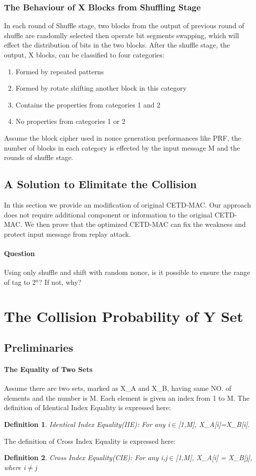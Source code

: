 \documentclass{article}
\newtheorem{defination}{Definition}[section]
\begin{document}
\subsubsection{The Behaviour of X Blocks from Shuffling Stage}
In each round of Shuffle stage, two blocks from the output of previous round of shuffle are randomlly selected then operate bit segments swapping, which will effect the distribution of bits in the two blocks. After the shuffle stage, the output, X blocks, can be classified to four categories:
\begin{enumerate}
	\item Formed by repeated patterns
	\item Formed by rotate shifting another block in this category
	\item Contains the properties from categories 1 and 2
	\item No properties from categories 1 or 2
\end{enumerate}
Assume the block cipher used in nonce generation performances like PRF, the number of blocks in each category is effected by the input message M and the rounds of shuffle stage.  
\subsection{A Solution to Elimitate the Collision}
In this section we provide an modification of original CETD-MAC. Our approach does not require additional component or information to the original CETD-MAC. We then prove that the optimized CETD-MAC can fix the weakness and protect input message from replay attack.
\paragraph{Question}
Using only shuffle and shift with random nonce, is it possible to ensure the range of tag to 2$^n$? If not, why?
\section{The Collision Probability of Y Set}

\subsection{Preliminaries}
\paragraph{The Equality of Two Sets}
Assume there are two sets, marked as X\_A and X\_B, having same NO. of elements and the number is M. Each element is given an index from 1 to M. The definition of Identical Index Equality is expressed here:
\begin{defination}
Identical Index Equality(IIE): For any i$\in$[1,M], X\_A[i]=X\_B[i].
\end{defination}
The definition of Cross Index Equality is expressed here:
\begin{defination}
Cross Index Equality(CIE): For any i,j$\in$[1,M], X\_A[i] = X\_B[j], where i$\neq$j
\end{defination}
\end{document}
